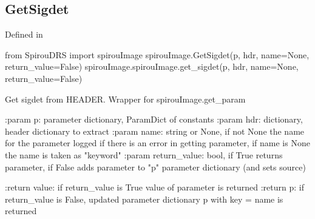 \noindent\begin{minipage}{\textwidth}
\subsection{GetSigdet}

Defined in \spirouImage{}

\begin{pythonbox}
from SpirouDRS import spirouImage
spirouImage.GetSigdet(p, hdr, name=None, return_value=False)
spirouImage.spirouImage.get_sigdet(p, hdr, name=None, return_value=False)
\end{pythonbox}

\begin{pythondocstring}
Get sigdet from HEADER. Wrapper for spirouImage.get_param

:param p: parameter dictionary, ParamDict of constants
:param hdr: dictionary, header dictionary to extract
:param name: string or None, if not None the name for the parameter
             logged if there is an error in getting parameter, if name is
             None the name is taken as "keyword"
:param return_value: bool, if True returns parameter, if False adds
                     parameter to "p" parameter dictionary (and sets source)

:return value: if return_value is True value of parameter is returned
:return p: if return_value is False, updated parameter dictionary p with
           key = name is returned
\end{pythondocstring}
\end{minipage}


